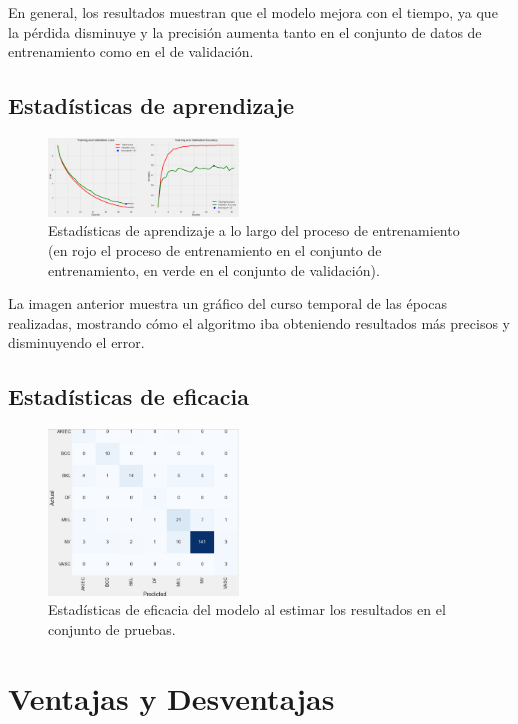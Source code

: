     En general, los resultados muestran que el modelo mejora con el tiempo, ya que la pérdida disminuye y la precisión aumenta tanto en el conjunto de datos de entrenamiento como en el de validación.

\subsection{Estadísticas de aprendizaje}\label{sub:learning_statistics_p2}
		\begin{figure}[ht]%
      \begin{center}
      \includegraphics[width=0.45\textwidth]{./Graphics/training_validation.png}
      \caption{Estadísticas de aprendizaje a lo largo del proceso de entrenamiento (en rojo el proceso de entrenamiento en el conjunto de entrenamiento, en verde en el conjunto de validación).\label{fig:training_validation_loss_p2}}
      \end{center}
		\end{figure}
  
La imagen anterior muestra un gráfico del curso temporal de las épocas realizadas, mostrando cómo el algoritmo iba obteniendo resultados más precisos y disminuyendo el error.

	\subsection{Estadísticas de eficacia}\label{sub:accuracy_statistic_p2}
    
    \begin{figure}[ht]%
		\begin{center}
		\includegraphics[width=0.45\textwidth]{./Graphics/confussion_matrix.png}
		\caption{Estadísticas de eficacia del modelo al estimar los resultados en el conjunto de pruebas.\label{fig:confussion_matrix}}
		\end{center}
		\end{figure}
    
    



\section{Ventajas y Desventajas}\label{sec:advantages_disadvantages_p2}
